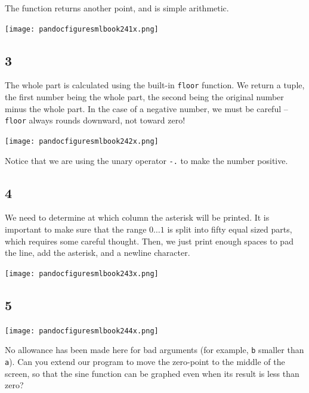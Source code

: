 \documentclass[]{book}
\begin{document}
The function returns another point, and is simple arithmetic.

\medskip
\begin{center}
\noindent\texttt{[image: pandocfiguresmlbook241x.png]}
\end{center}
\medskip

\subsection*{3}
The whole part is calculated using the built-in \texttt{floor} function. We return a tuple, the first number being the whole part, the second being the original number minus the whole part. In the case of a negative number, we must be careful -- \texttt{floor} always rounds downward, not toward zero!

\medskip
\begin{center}
\noindent\texttt{[image: pandocfiguresmlbook242x.png]}
\end{center}
\medskip

\noindent Notice that we are using the unary operator \texttt{-.} to make the number positive.

\subsection*{4}

We need to determine at which column the asterisk will be printed. It is important to make sure that the range $0\ldots 1$ is split into fifty equal sized parts, which requires some careful thought. Then, we just print enough spaces to pad the line, add the asterisk, and a newline character.

\medskip
\begin{center}
\noindent\texttt{[image: pandocfiguresmlbook243x.png]}
\end{center}
\medskip

\subsection*{5}

\medskip
\begin{center}
\noindent\texttt{[image: pandocfiguresmlbook244x.png]}
\end{center}
\medskip

\noindent No allowance has been made here for bad arguments (for example, \texttt{b} smaller than \texttt{a}). Can you extend our program to move the zero-point to the middle of the screen, so that the sine function can be graphed even when its result is less than zero?
\end{document}
